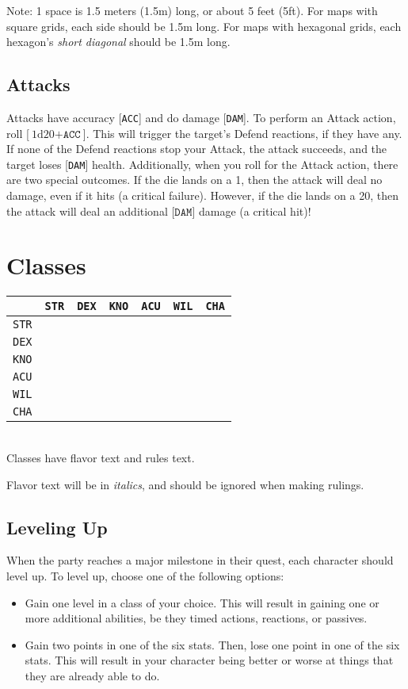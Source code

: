 \documentclass[12pt]{article}
\newcommand{\STR}{\texttt{STR}}
\newcommand{\DEX}{\texttt{DEX}}
\newcommand{\KNO}{\texttt{KNO}}
\newcommand{\ACU}{\texttt{ACU}}
\newcommand{\WIL}{\texttt{WIL}}
\newcommand{\CHA}{\texttt{CHA}}
\newcommand{\ACC}{\texttt{ACC}}
\newcommand{\DAM}{\texttt{DAM}}
\newcommand{\dice}[2]{\text{#1d#2}}
\begin{document}
Note: 1 space is 1.5 meters (1.5m) long, or about 5 feet (5ft). For maps with square grids, each side should be 1.5m long. For maps with hexagonal grids, each hexagon’s \textit{short diagonal} should be 1.5m long.

\subsection{Attacks}

Attacks have accuracy [\ACC] and do damage [\DAM]. To perform an Attack action, roll [$\dice{1}{20} + \ACC$]. This will trigger the target’s Defend reactions, if they have any. If none of the Defend reactions stop your Attack, the attack succeeds, and the target loses [\DAM] health. Additionally, when you roll for the Attack action, there are two special outcomes. If the die lands on a 1, then the attack will deal no damage, even if it hits (a critical failure). However, if the die lands on a 20, then the attack will deal an additional [$\DAM$] damage (a critical hit)!

\pagebreak
\section{Classes}

\begin{tabularx}{\textwidth}{c|CCCCCC}
& \STR & \DEX & \KNO & \ACU & \WIL & \CHA \\\hline
\STR &  &  &  &  &  &  \\
\DEX &  &  &  &  &  &  \\
\KNO &  &  &  &  &  &  \\
\ACU &  &  &  &  &  &   \\
\WIL &  &  &  &  &  &  \\
\CHA &  &  &  &  &  &  \\
\end{tabularx}
\\[5mm]
Classes have flavor text and rules text.

Flavor text will be in \textit{italics}, and should be ignored when making rulings.

\subsection{Leveling Up}

When the party reaches a major milestone in their quest, each character should level up. To level up, choose one of the following options:
\begin{itemize}
\item Gain one level in a class of your choice. This will result in gaining one or more additional abilities, be they timed actions, reactions, or passives.
\item Gain two points in one of the six stats. Then, lose one point in one of the six stats. This will result in your character being better or worse at things that they are already able to do.
\end{itemize}
\end{document}
